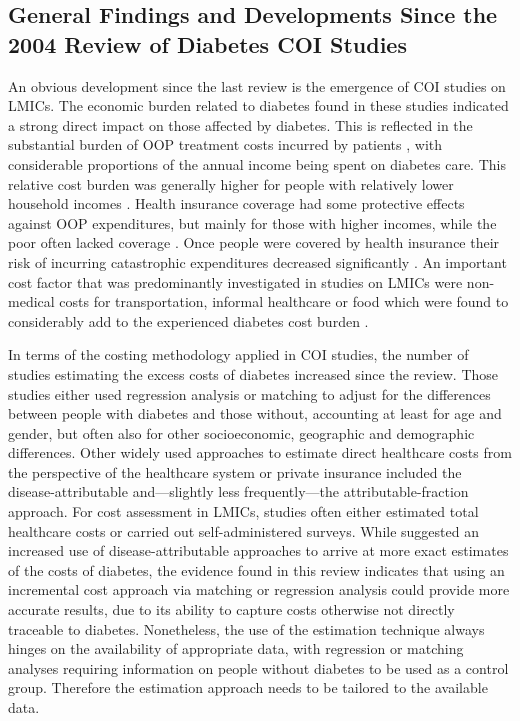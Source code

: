 \documentclass[12pt,english]{article}
\begin{document}
\subsection{General Findings and Developments Since the 2004 Review of Diabetes \ac{COI} Studies}
An obvious development since the last review is the emergence of \ac{COI} studies on \acp{LMIC}. The economic burden related to diabetes found in these studies indicated a strong direct impact on those affected by diabetes. This is reflected in the substantial burden of \ac{OOP} treatment costs incurred by patients \parencite{Smith-Spangler2012,Suleiman2006,Arredondo2007,Esteghamati2009,Wang2009b,Ramachandran2007d,Khowaja2007a,Elrayah-Eliadarous2010b,Chatterjee2011c,Tharkar2010a,Wang2010c}, with considerable proportions of the annual income being spent on diabetes care. This relative cost burden was generally higher for people with relatively lower household incomes \parencite{Ramachandran2007d,Khowaja2007a,Tharkar2010a}. Health insurance coverage had some protective effects against \ac{OOP} expenditures, but mainly for those with higher incomes, while the poor often lacked coverage \parencite{Ramachandran2007d,Khowaja2007a,Tharkar2010a}. Once people were covered by health insurance their risk of incurring catastrophic expenditures decreased significantly \parencite{Smith-Spangler2012}. An important cost factor that was predominantly investigated in studies on \acp{LMIC} were non-medical costs for transportation, informal healthcare or food which were found to considerably add to the experienced diabetes cost burden \parencite{Esteghamati2009,Wang2009b,Wang2009f,Chatterjee2011c,Tharkar2010a}.

In terms of the costing methodology applied in \ac{COI} studies, the number of studies estimating the excess costs of diabetes increased since the \textcite{Ettaro2004} review. Those studies either used regression analysis or matching to adjust for the differences between people with diabetes and those without, accounting at least for age and gender, but often also for other socioeconomic, geographic and demographic differences. Other widely used approaches to estimate direct healthcare costs from the perspective of the healthcare system or private insurance included the disease-attributable and---slightly less frequently---the attributable-fraction approach. For cost assessment in \acp{LMIC}, studies often either estimated total healthcare costs or carried out self-administered surveys. While \textcite{Ettaro2004} suggested an increased use of disease-attributable approaches to arrive at more exact estimates of the costs of diabetes, the evidence found in this review indicates that using an incremental cost approach via matching or regression analysis could provide more accurate results, due to its ability to capture costs otherwise not directly traceable to diabetes. Nonetheless, the use of the estimation technique always hinges on the availability of appropriate data, with regression or matching analyses requiring information on people without diabetes to be used as a control group. Therefore the estimation approach needs to be tailored to the available data. 
\end{document}
